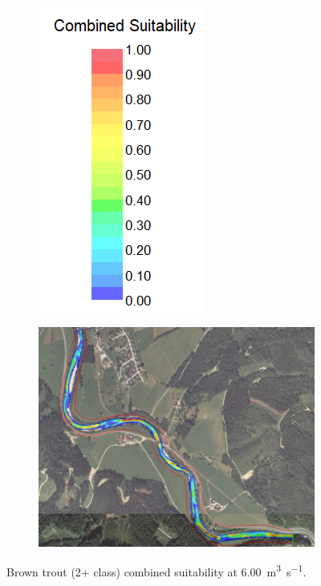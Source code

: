\begin{figure}[!htb] 
	\centering
	\begin{subfigure}{.3\textwidth}
		\centering
		\includegraphics[width=.7\linewidth]{images/suitability_index}
	\end{subfigure}%
	\begin{subfigure}{.7\textwidth}
		\centering
		\includegraphics[width=\linewidth]{images/2_0600}
	\end{subfigure}
	\caption{Brown trout (2+ class) combined suitability at \SI[per-mode=symbol]{6.00}{\cubic\meter\per\second}.}
	\label{fig:2_0600}
\end{figure}



